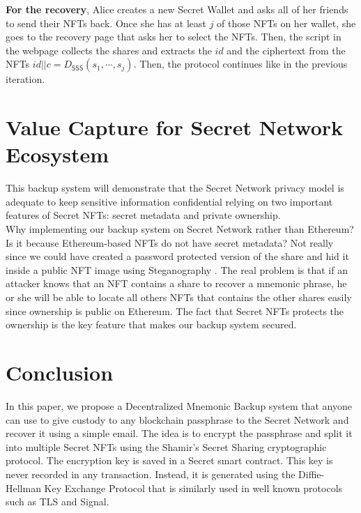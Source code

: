 \documentclass[12pt]{article}
\newcommand{\ms}[1]{\ensuremath{\mathsf{#1}}}
\begin{document}
{\bf For the recovery}, Alice creates a new Secret Wallet and asks all of her friends to send their NFTs back. Once she has at least $j$ of those NFTs on her wallet, she goes to the recovery page that asks her to select the NFTs. Then, the script in the webpage collects the shares and extracts the $id$ and the ciphertext from the NFTs $id||c = D_{\ms{SSS}}(s_1,\cdots,s_j)$. Then, the protocol continues like in the previous iteration. 

\section{Value Capture for Secret Network Ecosystem}

This backup system will demonstrate that the Secret Network privacy model is adequate to keep sensitive information confidential relying on two important features of Secret NFTs: secret metadata and private ownership.\\ 

Why implementing our backup system on Secret Network rather than Ethereum? Is it because Ethereum-based NFTs do not have secret metadata? Not really since we could have created a password protected version of the share and hid it inside a public NFT image using Steganography \cite{Steganography}. The real problem is that if an attacker knows that an NFT contains a share to recover a mnemonic phrase, he or she will be able to locate all others NFTs that contains the other shares easily since ownership is public on Ethereum. The fact that Secret NFTs protects the ownership is the key feature that makes our backup system secured. 

\section{Conclusion}

In this paper, we propose a Decentralized Mnemonic Backup system that anyone can use to give custody to any blockchain passphrase to the Secret Network \cite{SecretNetwork} and recover it using a simple email. The idea is to encrypt the passphrase and split it into multiple Secret NFTs using the Shamir's Secret Sharing cryptographic protocol. The encryption key is saved in a Secret smart contract. This key is never recorded in any transaction. Instead, it is generated using the Diffie-Hellman Key Exchange Protocol that is similarly used in well known protocols such as TLS and Signal. \\
\end{document}
